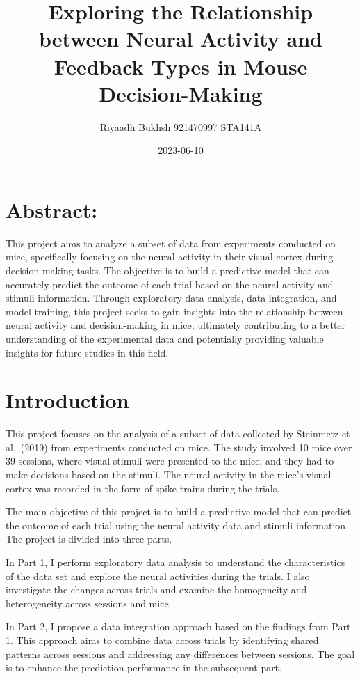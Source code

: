 \documentclass[
]{article}
\title{Exploring the Relationship between Neural Activity and Feedback
Types in Mouse Decision-Making}
\author{Riyaadh Bukhsh 921470997 STA141A}
\date{2023-06-10}
\begin{document}
\maketitle

\section{Abstract:}\label{abstract}

This project aims to analyze a subset of data from experiments conducted
on mice, specifically focusing on the neural activity in their visual
cortex during decision-making tasks. The objective is to build a
predictive model that can accurately predict the outcome of each trial
based on the neural activity and stimuli information. Through
exploratory data analysis, data integration, and model training, this
project seeks to gain insights into the relationship between neural
activity and decision-making in mice, ultimately contributing to a
better understanding of the experimental data and potentially providing
valuable insights for future studies in this field.

\section{Introduction}\label{introduction}

This project focuses on the analysis of a subset of data collected by
Steinmetz et al.~(2019) from experiments conducted on mice. The study
involved 10 mice over 39 sessions, where visual stimuli were presented
to the mice, and they had to make decisions based on the stimuli. The
neural activity in the mice's visual cortex was recorded in the form of
spike trains during the trials.

The main objective of this project is to build a predictive model that
can predict the outcome of each trial using the neural activity data and
stimuli information. The project is divided into three parts.

In Part 1, I perform exploratory data analysis to understand the
characteristics of the data set and explore the neural activities during
the trials. I also investigate the changes across trials and examine the
homogeneity and heterogeneity across sessions and mice.

In Part 2, I propose a data integration approach based on the findings
from Part 1. This approach aims to combine data across trials by
identifying shared patterns across sessions and addressing any
differences between sessions. The goal is to enhance the prediction
performance in the subsequent part.
\end{document}
